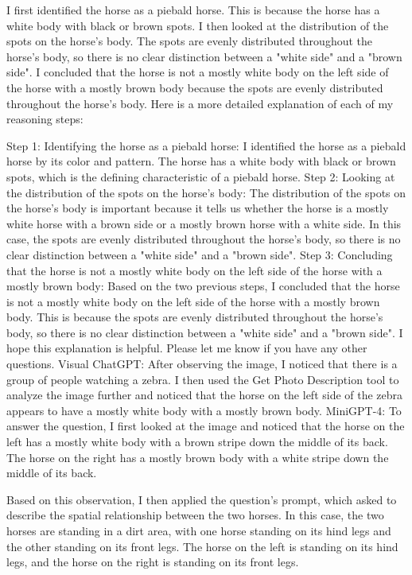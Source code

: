 \begin{enumerate}
        I first identified the horse as a piebald horse. This is because the horse has a white body with black or brown spots.
        I then looked at the distribution of the spots on the horse's body. The spots are evenly distributed throughout the horse's body, so there is no clear distinction between a "white side" and a "brown side".
        I concluded that the horse is not a mostly white body on the left side of the horse with a mostly brown body because the spots are evenly distributed throughout the horse's body.
        Here is a more detailed explanation of each of my reasoning steps:
        
        Step 1: Identifying the horse as a piebald horse: I identified the horse as a piebald horse by its color and pattern. The horse has a white body with black or brown spots, which is the defining characteristic of a piebald horse.
        Step 2: Looking at the distribution of the spots on the horse's body: The distribution of the spots on the horse's body is important because it tells us whether the horse is a mostly white horse with a brown side or a mostly brown horse with a white side. In this case, the spots are evenly distributed throughout the horse's body, so there is no clear distinction between a "white side" and a "brown side".
        Step 3: Concluding that the horse is not a mostly white body on the left side of the horse with a mostly brown body: Based on the two previous steps, I concluded that the horse is not a mostly white body on the left side of the horse with a mostly brown body. This is because the spots are evenly distributed throughout the horse's body, so there is no clear distinction between a "white side" and a "brown side".
        I hope this explanation is helpful. Please let me know if you have any other questions.
        \subitem Visual ChatGPT: After observing the image, I noticed that there is a group of people watching a zebra. I then used the Get Photo Description tool to analyze the image further and noticed that the horse on the left side of the zebra appears to have a mostly white body with a mostly brown body.
        \subitem MiniGPT-4: To answer the question, I first looked at the image and noticed that the horse on the left has a mostly white body with a brown stripe down the middle of its back. The horse on the right has a mostly brown body with a white stripe down the middle of its back.

        Based on this observation, I then applied the question’s prompt, which asked to describe the spatial relationship between the two horses. In this case, the two horses are standing in a dirt area, with one horse standing on its hind legs and the other standing on its front legs. The horse on the left is standing on its hind legs, and the horse on the right is standing on its front legs.
        

\end{enumerate}
